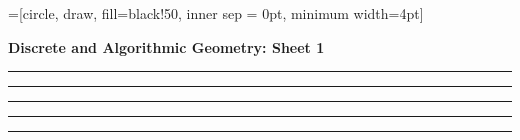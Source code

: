 \documentclass[a4paper, 10pt]{article}
\theoremstyle{definition} %
\begin{document}
\onehalfspacing
{}=[circle, draw, fill=black!50, inner sep = 0pt, minimum width=4pt]

\textbf{\Large Discrete and Algorithmic Geometry: Sheet 1}

\vspace{20pt}



\vspace{5pt}

\begin{center}
    \rule{5cm}{0.4pt}
\end{center}

\newpage



\vspace{5pt}

\begin{center}
    \rule{5cm}{0.4pt}
\end{center}

\newpage



\vspace{5pt}

\begin{center}
    \rule{5cm}{0.4pt}
\end{center}

\newpage



\vspace{5pt}

\begin{center}
    \rule{5cm}{0.4pt}
\end{center}

\newpage



\vspace{5pt}

\begin{center}
    \rule{5cm}{0.4pt}
\end{center}

\vspace{5pt}
\end{document}
